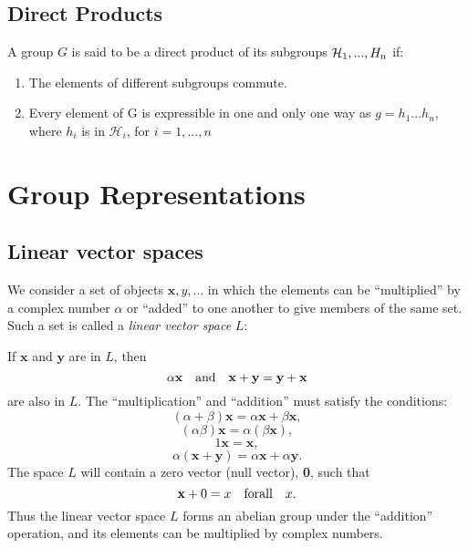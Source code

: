 \documentclass{book}
\begin{document}
\section{Direct Products}

A group $G$ is said to be a direct product of its subgroups ${\mathcal H_{\rm 1},...,H_{\rm n}}$ if:

\begin{enumerate}
\item The elements of different subgroups commute.
\item Every element of G is expressible in one and only one way as $g = h_1...h_n$, where $h_i$ is in ${\mathcal H}_i$, for $i = 1,...,n$
\end{enumerate}

\chapter{}

\chapter{Group Representations}

\section{Linear vector spaces}

\def\bx{\mathbf x}
\def\by{\mathbf y}

We consider a set of objects ${\mathbf x,y,...}$ in which the elements can be ``multiplied'' by a complex number $\alpha$ or ``added'' to one another to give members of the same set. Such a set is called a {\it linear vector space} $L$:

If $\bx$ and $\by$ are in $L$, then
$$
\alpha{\mathbf x} \quad {\rm and} \quad {\bx+\by = \by+\bx}
$$
are also in $L$. The ``multiplication'' and ``addition'' must satisfy the conditions:
$$(\alpha + \beta)\bx = \alpha\bx + \beta\bx,$$
$$(\alpha\beta)\bx = \alpha(\beta\bx),$$
$$1\bx = \bx,$$
$$\alpha(\bx+\by) = \alpha\bx + \alpha\by.$$
The space $L$ will contain a zero vector (null vector), {\bf 0}, such that
$$\mathbf x + 0 = x \quad {\rm for all} \quad x.$$
Thus the linear vector space $L$ forms an abelian group under the ``addition'' operation, and its elements can be multiplied by complex numbers.

\section{}
\end{document}
